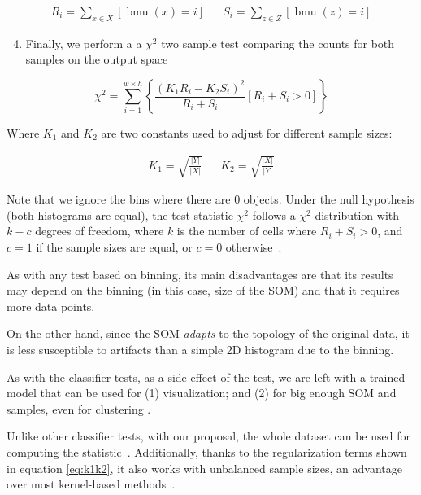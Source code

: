 \begin{align}
    R_i = \sum_{x \in X} [ \operatorname{bmu}(x) = i ] && S_i = \sum_{z \in Z} [ \operatorname{bmu}(z) = i ]
\end{align}

\begin{enumerate}
    \setcounter{enumi}{3}
    \item Finally, we perform a a $\chi^2$ two sample test comparing the counts for both samples
    on the output space
\end{enumerate}

\begin{equation}
    \label{eq:chi2}
    \chi^2 = \sum_{i=1}^{w \times h}{ \left\{ \frac{(K_1 R_i - K_2 S_i)^2}{R_i + S_i} [ R_i + S_i > 0 ] \right\}}
\end{equation}

Where $K_1$ and $K_2$ are two constants used to adjust for different sample sizes:

\begin{align}
    \label{eq:k1k2} K_1 = \sqrt{\frac{|Y|}{|X|}} && K_2 = \sqrt{\frac{|X|}{|Y|}}
\end{align}

Note that we ignore the bins where there are 0 objects. Under the null hypothesis
(both histograms are equal), the test statistic $\chi^2$ follows a $\chi^2$
distribution with $k - c$ degrees of freedom, where $k$ is the number of cells
where ${R_i + S_i > 0}$, and $c = 1$ if the sample sizes are equal, or $c = 0$
otherwise~\cite{press1993numerical}.

As with any test based on binning, its main disadvantages are that its results may
depend on the binning (in this case, size of the \gls{SOM}) and that it requires
more data points.

On the other hand, since the \gls{SOM}  \textit{adapts} to the topology of the
original data, it is less susceptible to artifacts than a simple 2D histogram
due to the binning.

As with the classifier tests, as a side effect of the test, we are left with a
trained model that can be used for (1) visualization; and (2) for big enough
\gls{SOM}  and samples, even for clustering \cite{ultsch2005esom}.

Unlike other classifier tests, with our proposal, the whole dataset can be used
for computing the statistic~\cite{kirchler2020two}. Additionally, thanks to the
regularization terms shown in equation \ref{eq:k1k2}, it also works with
unbalanced sample sizes, an advantage over most kernel-based methods~\cite{song2021fast}.

